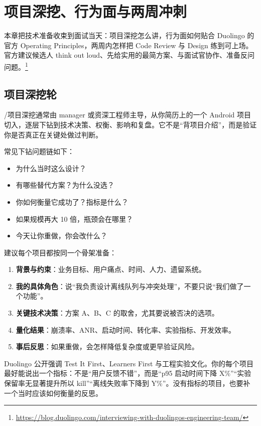 \chapter{项目深挖、行为面与两周冲刺}

本章把技术准备收束到面试当天：项目深挖怎么讲，行为面如何贴合 Duolingo 的官方 Operating Principles，两周内怎样把 Code Review 与 Design 练到可上场。\srcofficial 官方建议候选人 think out loud、先给实用的最简方案、与面试官协作、准备反问问题。\footnote{\url{https://blog.duolingo.com/interviewing-with-duolingos-engineering-team/}}

\section{项目深挖轮}

\srccommunity/\srcinferred 项目深挖通常由 manager 或资深工程师主导，从你简历上的一个 Android 项目切入，逐层下钻到技术决策、权衡、影响和复盘。它不是“背项目介绍”，而是验证你是否真正在关键处做过判断。

常见下钻问题链如下：

\begin{itemize}
  \item 为什么当时这么设计？
  \item 有哪些替代方案？为什么没选？
  \item 你如何衡量它成功了？指标是什么？
  \item 如果规模再大 10 倍，瓶颈会在哪里？
  \item 今天让你重做，你会改什么？
\end{itemize}

建议每个项目都按同一个骨架准备：

\begin{enumerate}
  \item \textbf{背景与约束}：业务目标、用户痛点、时间、人力、遗留系统。
  \item \textbf{我的具体角色}：说“我负责设计离线队列与冲突处理”，不要只说“我们做了一个功能”。
  \item \textbf{关键技术决策}：方案 A、B、C 的取舍，尤其要说被否决的选项。
  \item \textbf{量化结果}：崩溃率、ANR、启动时间、转化率、实验指标、开发效率。
  \item \textbf{事后反思}：如果重做，会怎样降低复杂度或更早验证风险。
\end{enumerate}

\begin{keypoint}
\srcofficial Duolingo 公开强调 Test It First、Learners First 与工程实验文化。你的每个项目最好能说出一个指标：不是“用户反馈不错”，而是“p95 启动时间下降 X\%”“实验保留率无显著提升所以 kill”“离线失败率下降到 Y\%”。没有指标的项目，也要补一个当时应该如何衡量的反思。
\end{keypoint}

